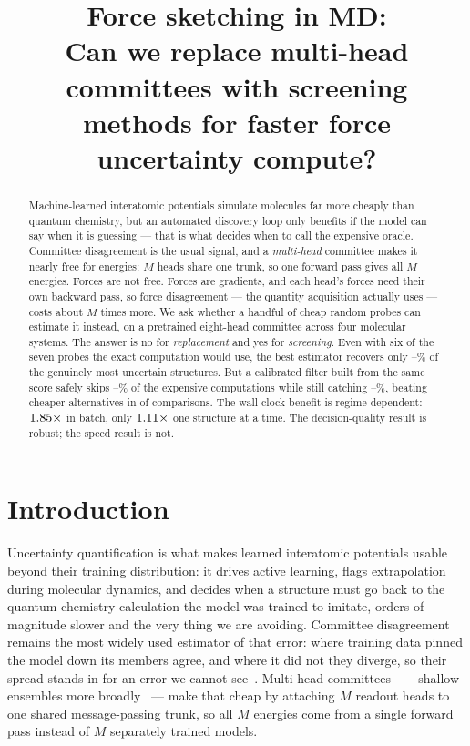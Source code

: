 \documentclass{article}
\title{Force sketching in MD:\\
Can we replace multi-head committees with screening\\
methods for faster force uncertainty compute?}
\author{}
\begin{document}
\maketitle

\begin{abstract}
Machine-learned interatomic potentials simulate molecules far more cheaply than quantum chemistry,
but an automated discovery loop only benefits if the model can say when it is guessing --- that is
what decides when to call the expensive oracle. Committee disagreement is the usual signal, and a
\emph{multi-head} committee makes it nearly free for energies: $M$ heads share one trunk, so one
forward pass gives all $M$ energies. Forces are not free. Forces are gradients, and each head's
forces need their own backward pass, so force disagreement --- the quantity acquisition actually
uses --- costs about $M$ times more. We ask whether a handful of cheap random probes can estimate it
instead, on a pretrained eight-head committee across four molecular systems. The answer is no for
\emph{replacement} and yes for \emph{screening}. Even with six of the seven probes the exact
computation would use, the best estimator recovers only
\fsMaxRecallKSixLoPct--\fsMaxRecallKSixHiPct\% of the genuinely most uncertain structures. But a
calibrated filter built from the same score safely skips
\fsGateCVSkipLoPct--\fsGateCVSkipHiPct\% of the expensive computations while still catching
\fsGateCVRecallLoPct--\fsGateCVRecallHiPct\%, beating cheaper alternatives in \fsGateCVDominates{} of
\fsGateCVComparisons{} comparisons. The wall-clock benefit is regime-dependent:
$1.85\times$ in batch, only $1.11\times$ one structure at a
time. The decision-quality result is robust; the speed result is not.
\end{abstract}

\section{Introduction}
Uncertainty quantification is what makes learned interatomic potentials usable beyond their training
distribution: it drives active learning, flags extrapolation during molecular dynamics, and decides
when a structure must go back to the quantum-chemistry calculation the model was trained to imitate,
orders of magnitude slower and the very thing we are avoiding. Committee disagreement remains the
most widely used estimator of that error: where training data pinned the model down its members
agree, and where it did not they diverge, so their spread stands in for an error we cannot
see~\citep{behler2015,podryabinkin2017,carrete2023}. Multi-head
committees~\citep{beck2025mhc} --- shallow ensembles more broadly~\citep{kellner2024} --- make that
cheap by attaching $M$ readout heads to one shared message-passing trunk, so all $M$ energies come
from a single forward pass instead of $M$ separately trained models.
\end{document}
